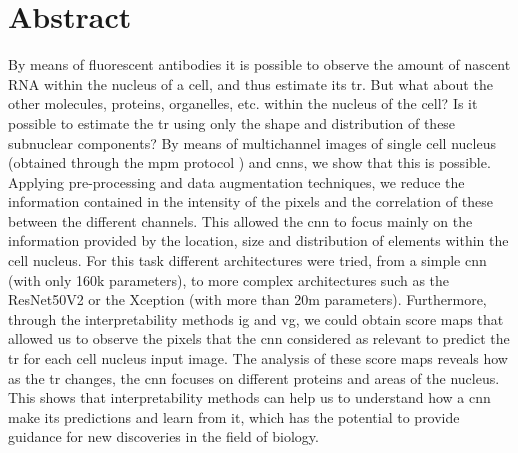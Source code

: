 

\glsresetall


\section*{Abstract}

By means of fluorescent antibodies it is possible to observe the amount of nascent RNA within the nucleus of a cell, and thus estimate its \gls{tr}. But what about the other molecules, proteins, organelles, etc. within the nucleus of the cell? Is it possible to estimate the \gls{tr} using only the shape and distribution of these subnuclear components? By means of multichannel images of single cell nucleus (obtained through the \gls{mpm} protocol \cite{Guteaar7042}) and \glspl{cnn}, we show that this is possible. 
Applying pre-processing and data augmentation techniques, we reduce the information contained in the intensity of the pixels and the correlation of these between the different channels. This allowed the \gls{cnn} to focus mainly on the information provided by the location, size and distribution of elements within the cell nucleus.
For this task different architectures were tried, from a simple \gls{cnn} (with only 160k parameters), to more complex architectures such as the ResNet50V2 or the Xception (with more than 20m parameters).
Furthermore, through the interpretability methods \gls{ig} and \gls{vg}, we could obtain score maps that allowed us to observe the pixels that the \gls{cnn} considered as relevant to predict the \gls{tr} for each cell nucleus input image. The analysis of these score maps reveals how as the \gls{tr} changes, the \gls{cnn} focuses on different proteins and areas of the nucleus. This shows that interpretability methods can help us to understand how a \gls{cnn} make its predictions and learn from it, which has the potential to provide guidance for new discoveries in the field of biology.
